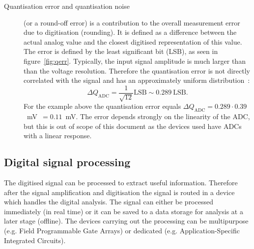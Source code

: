 \begin{description}
\item[Quantisation error and quantisation noise] (or a round-off error) is a contribution to the overall measurement error due to digitisation (rounding). It is defined as a difference between the actual analog value and the closest digitised representation of this value. The error is defined by the least significant bit (LSB), as seen in figure~\ref{fig:qerr}. Typically, the input signal amplitude is much larger than than the voltage resolution. Therefore the quantisation error is not directly correlated with the signal and has an approximately uniform distribution~\cite{}: 
\begin{equation}
\label{eq:qerr}
\Delta Q_\mathrm{ADC}=\frac{1}{\sqrt{12}}\mathrm{LSB}\sim0.289~\mathrm{LSB}.
\end{equation} 
For the example above the quantisation error equals $\Delta Q_\mathrm{ADC}=0.289\cdot 0.39$~mV~$=0.11$~mV. The error depends strongly on the linearity of the ADC, but this is out of scope of this document as the devices used have ADCs with a linear response.
\end{description}

\subsection{Digital signal processing}
The digitised signal can be processed to extract useful information. Therefore after the signal amplification and digitisation the signal is routed in a device which handles the digital analysis. The signal can either be processed immediately (in real time) or it can be saved to a data storage for analysis at a later stage (offline). The devices carrying out the processing can be multipurpose (e.g. Field Programmable Gate Arrays) or dedicated (e.g. Application-Specific Integrated Circuits).

